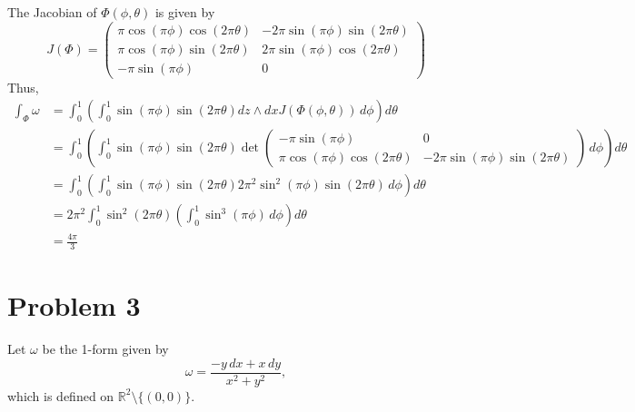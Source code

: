 \documentclass[11pt]{article}
\begin{document}
\begin{solution}
    The Jacobian of $\Phi(\phi, \theta)$ is given by 
    \[J(\Phi) = \begin{pmatrix}
        \pi \cos(\pi \phi)\cos(2\pi \theta) & -2\pi \sin(\pi \phi)\sin(2\pi \theta)\\
        \pi \cos(\pi \phi)\sin(2\pi \theta) & 2\pi\sin(\pi \phi) \cos(2\pi \theta)\\
        -\pi\sin(\pi \phi) & 0
    \end{pmatrix}\]
    Thus, 
    \begin{align*}
        \int_\Phi \omega &= \int_0^1 \left( \int_0^1 \sin(\pi\phi) \sin(2\pi\theta) dz \wedge dx J(\Phi(\phi, \theta))\, d\phi\right) d\theta\\
        &= \int_0^1 \left( \int_0^1 \sin(\pi\phi) \sin(2\pi\theta) \det \begin{pmatrix}
            -\pi \sin(\pi \phi) & 0\\
            \pi \cos(\pi \phi)\cos(2\pi \theta) & -2\pi \sin(\pi \phi)\sin(2\pi \theta)
        \end{pmatrix}\, d\phi\right) d\theta\\
        &=  \int_0^1 \left( \int_0^1 \sin(\pi\phi) \sin(2\pi\theta) 2\pi^2 \sin^2(\pi \phi)\sin(2\pi \theta)\, d\phi\right) d\theta\\
        &= 2\pi ^2\int_0^1 \sin^2(2\pi\theta)  \left( \int_0^1 \sin^3(\pi \phi)\, d\phi\right) d\theta\\
        &= \frac{4\pi }{3}
    \end{align*}
\end{solution}

\newpage
\section*{Problem 3}
Let \(\omega\) be the 1-form given by
\[
\omega = \frac{-y\,dx + x\,dy}{x^2 + y^2},
\]
which is defined on \(\mathbb{R}^2 \setminus \{(0, 0)\}\).
\end{document}
